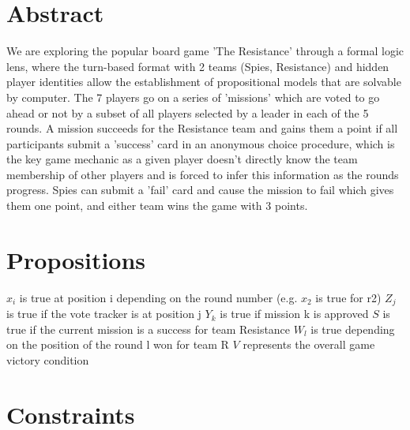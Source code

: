 \documentclass[pdftex,10pt,a4paper]{article}
\numberwithin{equation}{section} %
\begin{document}
\section*{Abstract}
We are exploring the popular board game 'The Resistance' through a formal logic lens, where the turn-based format with 2 teams (Spies, Resistance) and hidden player identities allow the establishment of propositional models that are solvable by computer. The 7 players go on a series of 'missions' which are voted to go ahead or not by a subset of all players selected by a leader in each of the 5 rounds. A mission succeeds for the Resistance team and gains them a point if all participants submit a 'success' card in an anonymous choice procedure, which is the key game mechanic as a given player doesn't directly know the team membership of other players and is forced to infer this information as the rounds progress. Spies can submit a 'fail' card and cause the mission to fail which gives them one point, and either team wins the game with 3 points. 


\section*{Propositions}
$x_i$ is true at position i depending on the round number (e.g. $x_2$ is true for r2)\newline
$Z_j$ is true if the vote tracker is at position j \newline
$Y_k$ is true if mission k is approved \newline
$S$ is true if the current mission is a success for team Resistance \newline
$W_l$ is true depending on the position of the round l won for team R \newline
$V$ represents the overall game victory condition \newline

\section*{Constraints}
\end{document}
